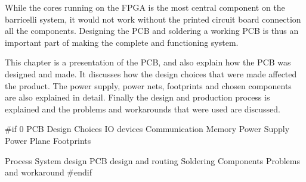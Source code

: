 
While the cores running on the FPGA is the most central component on the barricelli system, it would not work without the printed circuit board connection all the components.
Designing the PCB and soldering a working PCB is thus an important part of making the complete and functioning system.

This chapter is a presentation of the PCB, and also explain how the PCB was designed and made.
It discusses how the design choices that were made affected the product.
The power supply, power nets, footprints and chosen components are also explained in detail.
Finally the design and production process is explained and the problems and workarounds that were used are discussed.

 \label{pcb:section:design_choices}

 \label{pcb:section:power_supply}

 \label{pcb:section:power_plane}

 \label{pcb:section:footprints}

 \label{pcb:section:process}

 \label{pcb:section:components}

 \label{pcb:section:problems_and_workaround}

\#if 0
PCB
    Design Choices
        IO devices
        Communication
        Memory
    Power Supply
    Power Plane
    Footprints
        
    Process
        System design
        PCB design and routing
        Soldering
    Components
    Problems and workaround
\#endif
